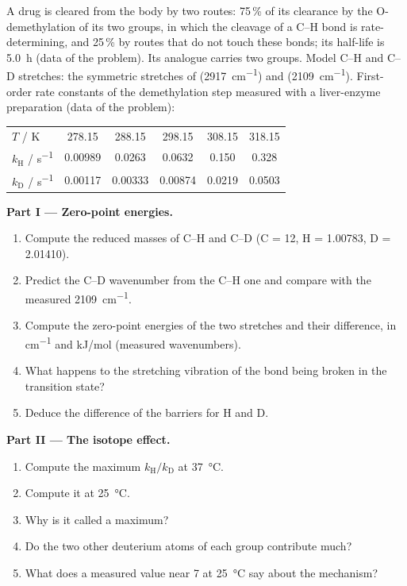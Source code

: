 \begin{problem}
\label{pb:b3:rate-theories:1}
A drug is cleared from the body by two routes: 75\,\% of its clearance by the
O-demethylation of its two  groups, in which the cleavage of a C--H bond is
rate-determining, and 25\,\% by routes that do not touch these bonds; its
half-life is \qty{5.0}{h} (data of the problem). Its analogue carries two 
groups. Model C--H and C--D stretches: the symmetric stretches of 
(\qty{2917}{cm^{-1}}) and  (\qty{2109}{cm^{-1}}). First-order rate constants of the
demethylation step measured with a liver-enzyme preparation (data of the
problem):
\begin{center}\small
\begin{tabular}{lccccc}
\hline
$T$ / K & 278.15 & 288.15 & 298.15 & 308.15 & 318.15 \\
$k_{\mathrm H}$ / \unit{s^{-1}} & 0.00989 & 0.0263 & 0.0632 & 0.150 & 0.328 \\
$k_{\mathrm D}$ / \unit{s^{-1}} & 0.00117 & 0.00333 & 0.00874 & 0.0219 & 0.0503 \\ \hline
\end{tabular}
\end{center}

\medskip\noindent\textbf{Part I --- Zero-point energies.}
\begin{enumerate}
  \item Compute the reduced masses of C--H and C--D (C = 12, H = 1.00783,
        D = 2.01410).
  \item Predict the C--D wavenumber from the C--H one and compare with the
        measured \qty{2109}{cm^{-1}}.
  \item Compute the zero-point energies of the two stretches and their
        difference, in \unit{cm^{-1}} and \unit{kJ/mol} (measured wavenumbers).
  \item What happens to the stretching vibration of the bond being broken in
        the transition state?
  \item Deduce the difference of the barriers for H and D.
\end{enumerate}

\medskip\noindent\textbf{Part II --- The isotope effect.}
\begin{enumerate}[resume]
  \item Compute the maximum $k_{\mathrm H}/k_{\mathrm D}$ at \qty{37}{\celsius}.
  \item Compute it at \qty{25}{\celsius}.
  \item Why is it called a maximum?
  \item Do the two other deuterium atoms of each  group contribute much?
  \item What does a measured value near 7 at \qty{25}{\celsius} say about the
        mechanism?
\end{enumerate}


\end{problem}
